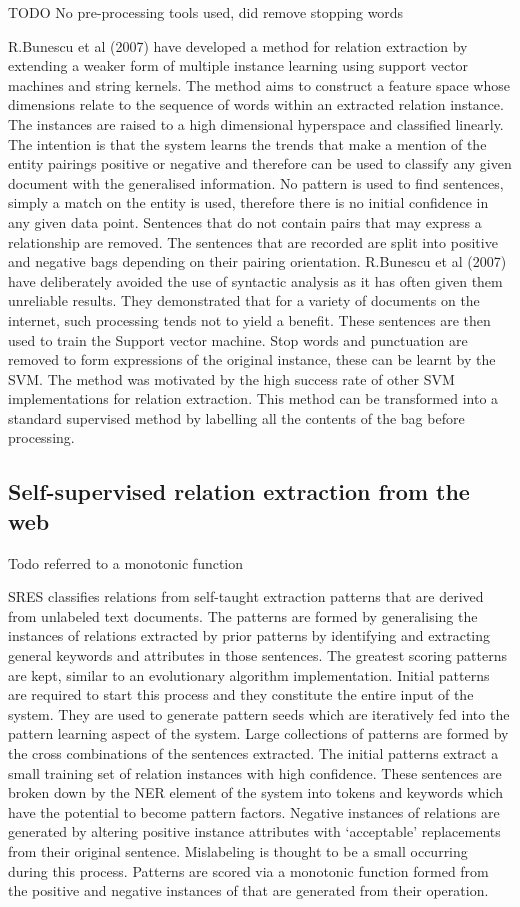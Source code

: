 \documentclass[11pt]{article} %
\begin{document}
TODO No pre-processing tools used, did remove stopping words

R.Bunescu et al (2007) have developed a method for relation extraction by extending a weaker form of multiple instance learning using support vector machines and string kernels. The method aims to construct a feature space whose dimensions relate to the sequence of words within an extracted relation instance. The instances are raised to a high dimensional hyperspace and classified linearly. The intention is that the system learns the trends that make a mention of the entity pairings positive or negative and therefore can be used to classify any given document with the generalised information. No pattern is used to find sentences, simply a match on the entity is used, therefore there is no initial confidence in any given data point. Sentences that do not contain pairs that may express a relationship are removed. The sentences that are recorded are split into positive and negative bags depending on their pairing orientation. R.Bunescu et al (2007) have deliberately avoided the use of syntactic analysis as it has often given them unreliable results. They demonstrated that for a variety of documents on the internet, such processing tends not to yield a benefit. These sentences are then used to train the Support vector machine. Stop words and punctuation are removed to form expressions of the original instance, these can be learnt by the SVM. The method was motivated by the high success rate of other SVM implementations for relation extraction. This method can be transformed into a standard supervised method by labelling all the contents of the bag before processing.

\subsection{Self-supervised relation extraction from the web}

Todo referred to a monotonic function

SRES classifies relations from self-taught extraction patterns that are derived from unlabeled text documents. The patterns are formed by generalising the instances of relations extracted by prior patterns by identifying and extracting general keywords and attributes in those sentences. The greatest scoring patterns are kept, similar to an evolutionary algorithm implementation. Initial patterns are required to start this process and they constitute the entire input of the system. They are used to generate pattern seeds which are iteratively fed into the pattern learning aspect of the system. Large collections of patterns are formed by the cross combinations of the sentences extracted. The initial patterns extract a small training set of relation instances with high confidence. These sentences are broken down by the NER element of the system into tokens and keywords which have the potential to become pattern factors. Negative instances of relations are generated by altering positive instance attributes with ‘acceptable’ replacements from their original sentence. Mislabeling is thought to be a small occurring during this process. Patterns are scored via a monotonic function formed from the positive and negative instances of that are generated from their operation.
\end{document}
